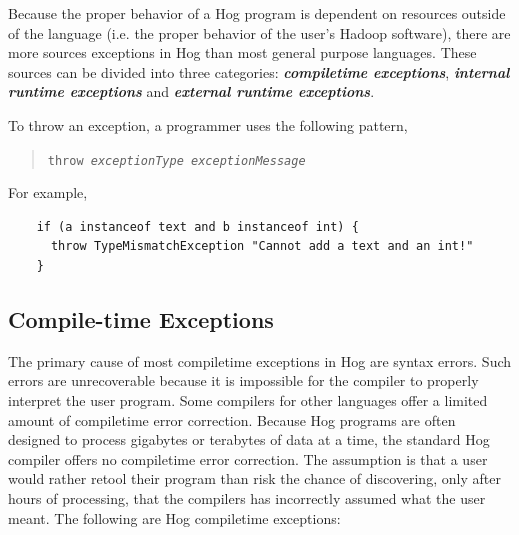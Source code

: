 \documentclass{article}
\begin{document}
Because the proper behavior of a Hog program is dependent on resources outside of
the language (i.e. the proper behavior of the user’s Hadoop software), there are
more sources exceptions in Hog than most general purpose languages. These sources
can be divided into three categories: \textbf{\emph{compile­time exceptions}},
\textbf{\emph{internal run­time exceptions}} and \textbf{\emph{external run­time
exceptions}}.

To throw an exception, a programmer uses the following pattern,

\begin{quotation}
\tt throw \rm \emph{exceptionType} \emph{exceptionMessage}
\end{quotation}

\noindent For example,

\begin{verbatim}
    if (a instanceof text and b instanceof int) {
      throw TypeMismatchException "Cannot add a text and an int!"
    }
\end{verbatim}

\subsection{Compile-time Exceptions} %
\label{sub:compile_time_exceptions}

The primary cause of most compile­time exceptions in Hog are syntax errors. Such
errors are unrecoverable because it is impossible for the compiler to properly
interpret the user program. Some compilers for other languages offer a limited
amount of compile­time error correction. Because Hog programs are often designed
to process gigabytes or terabytes of data at a time, the standard Hog compiler
offers no compile­time error correction. The assumption is that a user would
rather re­tool their program than risk the chance of discovering, only after hours
of processing, that the compilers has incorrectly assumed what the user meant. The
following are Hog compile­time exceptions:
\end{document}
